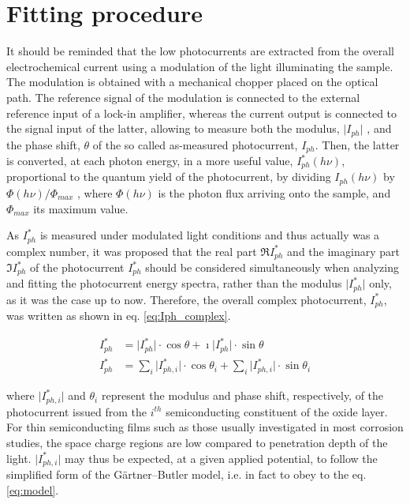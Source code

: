 \section{Fitting procedure}
It should be reminded that the low photocurrents are extracted from the overall 
electrochemical current using a modulation of the light illuminating the sample. 
The modulation is obtained with a mechanical chopper placed on the optical path. 
The reference signal of the modulation is connected to the external reference 
input of a lock-in amplifier, whereas the current output is connected to the 
signal input of the latter, allowing to measure both the modulus, 
$\vert I_{ph} \vert$ , and the phase shift, $\theta$ of the so called 
as-measured photocurrent, $I_{ph}$. Then, the latter is converted, at 
each photon energy, in a more useful value, $I_{ph}^* (h\nu)$, proportional 
to the quantum yield of the photocurrent, by dividing $I_{ph}(h\nu)$ 
by $\Phi(h\nu)/\Phi_{max}$  , where $\Phi(h\nu)$ is the photon flux arriving 
onto the sample, and $\Phi_{max}$ its maximum value. 

As $I_{ph}^*$ is measured under modulated light conditions and thus actually 
was a complex number, it was proposed that the real part $\Re I_{ph}^* $ 
and the imaginary part $\Im I_{ph}^*$ of the photocurrent $I_{ph}^*$ should 
be considered simultaneously when analyzing and fitting the photocurrent 
energy spectra, rather than the modulus $\vert I_{ph}^* \vert$ only, as it 
was the case up to now. 
Therefore, the overall complex photocurrent, $I_{ph}^*$, was written as 
shown in eq. \ref{eq:Iph_complex}.

\begin{equation}
\begin{split}
I_{ph}^* &= \vert I_{ph}^* \vert \cdot \cos \theta + \imath \vert I_{ph}^* \vert \cdot \sin \theta \\
I_{ph}^* &= \sum _i \vert I_{ph,i}^* \vert \cdot \cos \theta _i + \sum _i \vert I_{ph,i}^* \vert \cdot \sin \theta _i 
\end{split}
\label{eq:Iph_complex}
\end{equation}

\noindent where $\vert I_{ph,i}^* \vert$ and $\theta _i$ represent the modulus 
and phase shift, respectively, of the photocurrent issued from the $i^{th}$ 
semiconducting constituent of the oxide layer. For thin semiconducting films 
such as those usually investigated in most corrosion studies, the space charge 
regions are low compared to penetration depth of the light.  
$\vert I_{ph,i}^* \vert$ may thus be expected, at a given applied potential, 
to follow the simplified form of the Gärtner–Butler model, i.e. in fact to 
obey to the eq. \ref{eq:model}.


